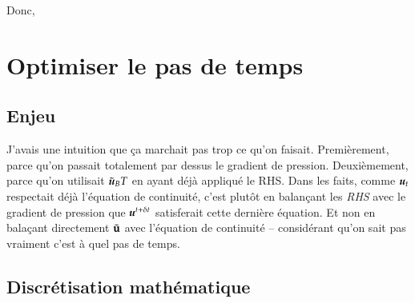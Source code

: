 \documentclass[10pt]{article}
\numberwithin{equation}{section}
\newcommand{\uu}{\vb*{u}}
\begin{document}
Donc, 





\section{Optimiser le pas de temps}
\label{sec:org9022171}
\subsection{Enjeu}
\label{sec:org453d83c}
J'avais une intuition que ça marchait pas trop ce qu'on faisait.
Premièrement, parce qu'on passait totalement par dessus le gradient de pression.
Deuxièmement, parce qu'on utilisait \(\tilde{\uu}_BT\) en ayant déjà appliqué le RHS.
Dans les faits, comme \(\uu_{t}\) respectait déjà l'équation de continuité, c'est plutôt en balançant les \emph{RHS} avec le gradient de pression que \(\uu^{t+\delta t}\) satisferait cette dernière équation.
Et non en balaçant directement \(\tilde{\vb{u}}\) avec l'équation de continuité -- considérant qu'on sait pas vraiment c'est à quel pas de temps.

\subsection{Discrétisation mathématique}
\label{sec:org49db656}
\end{document}
